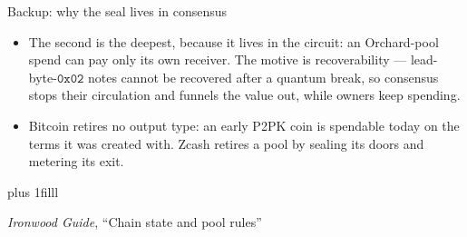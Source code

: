 \documentclass[aspectratio=169,11pt]{beamer}
\newcommand{\src}[1]{\par\vskip0pt plus 1filll
  {\fontsize{6}{7.2}\selectfont\color{arbdim}\raggedright #1\par}}
\begin{document}
\begin{frame}{Backup: why the seal lives in consensus}
\begin{itemize}
  \item The second is the deepest, because it lives in the circuit: an
    Orchard-pool spend can pay only its own receiver. The motive is
    recoverability --- lead-byte-$\mathtt{0x02}$ notes cannot be
    recovered after a quantum break, so consensus stops their
    circulation and funnels the value out, while owners keep spending.
  \item Bitcoin retires no output type: an early P2PK coin is spendable
    today on the terms it was created with. Zcash retires a pool by
    sealing its doors and metering its exit.
\end{itemize}
\src{\emph{Ironwood Guide}, ``Chain state and pool rules''}
\end{frame}
\end{document}
